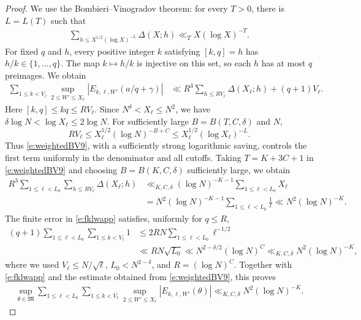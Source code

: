 \documentclass[12pt,reqno]{amsart}
\numberwithin{equation}{section}
\theoremstyle{definition}
\theoremstyle{remark}
\begin{document}
\begin{proof}
We use the  Bombieri--Vinogradov theorem: for every
\(T>0\), there is \(L=L(T)\) such that
\begin{align}\label{e:weightedBV9}
 \sum_{h\leq X^{1/2}(\log X)^{-L}}\Delta(X;h)
 \ll_T X(\log X)^{-T}.
\end{align}
For fixed \(q\) and \(h\), every positive integer \(k\) satisfying
\([k,q]=h\) has \(h/k\in\{1,\ldots,q\}\).
The map \(k\mapsto h/k\) is injective on this set, so each \(h\)
has at most \(q\) preimages. We obtain
\begin{align*}
 \sum_{1\leq k<V_{\ell}}
 \sup_{2\leq W'\leq X_\ell}
 |E_{k,\ell,W'}(a/q+\gamma)|
 &\ll
 R^3\sum_{h\leq RV_\ell}\Delta(X_\ell;h)
 +(q+1)V_{\ell}.
\end{align*}
Here \([k,q]\leq kq\leq RV_\ell\). Since
\(N^\delta<X_\ell\leq N^2\), we have $ \delta\log N<\log X_\ell\leq2\log N.$
For sufficiently large \(B=B(T,C,\delta)\) and \(N\),
\[
 RV_\ell
 \leq X_\ell^{1/2}(\log N)^{-B+C}
 \leq X_\ell^{1/2}(\log X_\ell)^{-L}.
\]
Thus \eqref{e:weightedBV9}, with a sufficiently strong logarithmic
saving, controls the first term uniformly in the denominator and
all cutoffs. Taking \(T=K+3C+1\) in \eqref{e:weightedBV9} and choosing
\(B=B(K,C,\delta)\) sufficiently large, we obtain
\begin{align*}
 R^3\sum_{1\leq\ell<L_0}
 \sum_{h\leq RV_\ell}\Delta(X_\ell;h)
 &\ll_{K,C,\delta}
 (\log N)^{-K-1}\sum_{1\leq\ell<L_0}X_\ell\\
 &=N^2(\log N)^{-K-1}
 \sum_{1\leq\ell<L_0}\frac1\ell \ll N^2(\log N)^{-K}.
\end{align*}
The finite error in \eqref{e:fklwapp} satisfies, uniformly for
\(q\leq R\),
\begin{align*}
 (q+1)\sum_{1\leq\ell<L_0}\sum_{1\leq k<V_\ell}1
 &\leq2RN\sum_{1\leq\ell<L_0}\ell^{-1/2}\\
 &\ll RN\sqrt{L_0}
 \ll N^{2-\delta/2}(\log N)^C \ll_{K,C,\delta}N^2(\log N)^{-K},
\end{align*}
where we used \(V_\ell\leq N/\sqrt\ell\),
\(L_0<N^{2-\delta}\), and \(R=(\log N)^C\).
Together with \eqref{e:fklwapp} and the estimate obtained from
\eqref{e:weightedBV9}, this proves
\begin{align}\label{e:majorlinearerror9}
 \sup_{\theta\in\mathfrak M}
 \sum_{1\leq\ell<L_0}\sum_{1\leq k<V_\ell}
 \sup_{2\leq W'\leq X_\ell}
 |E_{k,\ell,W'}(\theta)|
 \ll_{K,C,\delta}N^2(\log N)^{-K}.
\end{align}


\end{proof}
\end{document}
